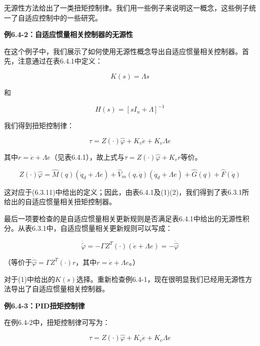 \documentclass[12pt,a4paper]{ctexart}
\begin{document}
无源性方法给出了一类扭矩控制律。我们用一些例子来说明这一概念，这些例子统一了自适应控制中的一些研究。

\textbf{例6.4-2：自适应惯量相关控制器的无源性}

在这个例子中，我们展示了如何使用无源性概念导出自适应惯量相关控制器。首先，注意通过在表6.4.1中定义：

\begin{equation}
K(s) = \Lambda s \tag{1}
\end{equation}

和

\begin{equation}
H(s) = [sI_n + \Lambda]^{-1} \tag{2}
\end{equation}

我们得到扭矩控制律：

\begin{equation}
\tau = Z(\cdot)\hat{\varphi} + K_v\dot{e} + K_v\Lambda e \tag{3}
\end{equation}

其中$r=\dot{e}+\Lambda e$（见表6.4.1），故上式与$\tau = Z(\cdot)\hat{\varphi} + K_v r$等价。

\begin{equation}
Z(\cdot)\hat{\varphi} = \hat{M}(q)(\ddot{q}_d + \Lambda \dot{e}) + \hat{V}_m(q, \dot{q})(\dot{q}_d + \Lambda e) + \hat{G}(q) + \hat{F}(\dot{q})
\end{equation}

这对应于(6.3.11)中给出的定义；因此，由表6.4.1及(1)(2)，我们得到了表6.3.1所给出的自适应惯量相关扭矩控制器。

最后一项要检查的是自适应惯量相关更新规则是否满足表6.4.1中给出的无源性积分。从表6.3.1中，自适应惯量相关更新规则可以写成：

\begin{equation}
\dot{\tilde{\varphi}} = -\Gamma Z^T(\cdot)(\dot{e} + \Lambda e) = -\dot{\hat{\varphi}} \tag{5}
\end{equation}

（等价于$\dot{\hat{\varphi}}=\Gamma Z^T(\cdot)r$，其中$r=\dot{e}+\Lambda e$。）

对于(1)中给出的$K(s)$选择。重新检查例6.4-1，现在很明显我们已经用无源性方法导出了自适应惯量相关控制器。

\textbf{例6.4-3：PID扭矩控制律}

在例6.4-2中，扭矩控制律可写为：

\begin{equation}
\tau = Z(\cdot)\hat{\varphi} + K_v\dot{e} + K_v\Lambda e \tag{1}
\end{equation}
\end{document}
